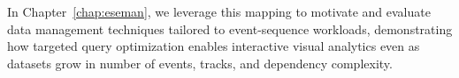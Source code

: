 \begin{refsection}
In Chapter~\ref{chap:eseman}, we leverage this mapping to motivate and evaluate data management techniques tailored to event-sequence workloads, demonstrating how targeted query optimization enables interactive visual analytics even as datasets grow in number of events, tracks, and dependency complexity.

\printbibliography[heading=subbibnumbered]
\end{refsection}